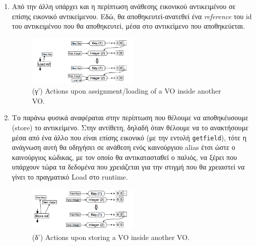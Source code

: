 \begin{enumerate}[label=\alph*]
\item Από την άλλη υπάρχει και η περίπτωση ανάθεσης εικονικού αντικειμένου σε
επίσης εικονικό αντικείμενου. Εδώ, θα αποθηκευτεί-ανατεθεί ένα
\textit{reference} του id του αντικειμένου που θα αποθηκευτεί, μέσα στο
αντικείμενο που αποθηκεύεται.

\begin{figure}[h]
\centering
\includegraphics[width=0.5\textwidth]{virtual-virtual-load.png}
\caption{(γ') Actions upon assignment/loading of a VO inside another VO. \cite{stadler2014partial}}
\label{figure-23}
\end{figure}

\item Το παράνω φυσικά αναφέραται στην περίπτωση που θέλουμε να αποθηκέυσουμε
(store) το αντικείμενο. Στην αντίθετη, δηλαδή όταν θέλουμε να το ανακτήσουμε
μέσα από ένα άλλο που είναι επίσης εικονικό (με την εντολή \texttt{getfield}),
τότε η ανάγνωση αυτή θα οδηγήσει σε ανάθεση ενός καινούργιου alias έτσι ώστε ο
καινούργιος κώδικας, με τον οποίο θα αντικατασταθεί ο παλιός, να ξέρει που
υπάρχουν τώρα τα δεδομένα που χρειάζεται για την στιγμή που θα χρειαστεί να
γίνει το πραγματικό Load στο runtime.

\begin{figure}[h]
\centering
\includegraphics[width=0.5\textwidth]{virtual-virtual-store.png}
\caption{(δ') Actions upon storing a VO inside another VO. \cite{stadler2014partial}}
\label{figure-24}
\end{figure}

\end{enumerate}

